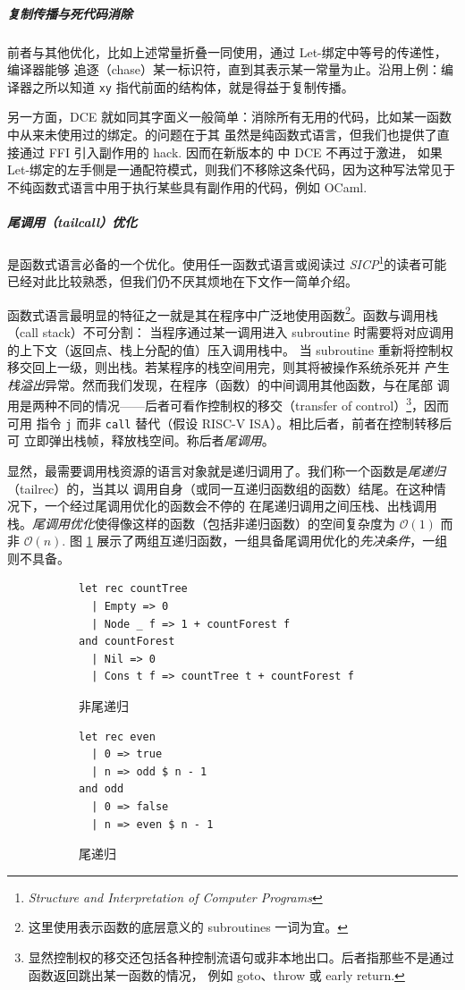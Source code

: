 \subparagraph{复制传播与死代码消除} 前者与其他优化，比如上述常量折叠一同使用，通过 Let-绑定中等号的传递性，编译器能够
追逐（chase）某一标识符，直到其表示某一常量为止。沿用上例：编译器之所以知道 \texttt{xy} 指代前面的结构体，就是得益于复制传播。

另一方面，DCE 就如同其字面义一般简单：消除所有无用的代码，比如某一函数中从来未使用过的绑定。\Tigris 的问题在于其
虽然是纯函数式语言，但我们也提供了直接通过 FFI 引入副作用的 hack. 因而在新版本的 \Tigris 中 DCE 不再过于激进，
如果 Let-绑定的左手侧是一通配符模式，则我们不移除这条代码，因为这种写法常见于不纯函数式语言中用于执行某些具有副作用的代码，例如 OCaml.

\subparagraph{尾调用（tailcall）优化} 是函数式语言必备的一个优化。使用任一函数式语言或阅读过 \emph{SICP}\footnote{
  \emph{Structure and Interpretation of Computer Programs}
}的读者可能已经对此比较熟悉，但我们仍不厌其烦地在下文作一简单介绍。

函数式语言最明显的特征之一就是其在程序中广泛地使用函数\footnote{这里使用表示函数的底层意义的 subroutines 一词为宜。}。函数与调用栈（call stack）不可分割：
当程序通过某一调用进入 subroutine 时需要将对应调用的上下文（返回点、栈上分配的值）压入调用栈中。
当 subroutine 重新将控制权移交回上一级，则出栈。若某程序的栈空间用完，则其将被操作系统杀死并
产生\emph{栈溢出}异常。然而我们发现，在程序（函数）的中间调用其他函数，与在尾部
调用是两种不同的情况——后者可看作控制权的移交（transfer of control）\footnote{
  显然控制权的移交还包括各种控制流语句或非本地出口。后者指那些不是通过函数返回跳出某一函数的情况，
  例如 goto、throw 或 early return.
}，因而可用
指令 \texttt{j} 而非 \texttt{call} 替代（假设 RISC-V ISA）。相比后者，前者在控制转移后可
立即弹出栈帧，释放栈空间。称后者\emph{尾调用}。

显然，最需要调用栈资源的语言对象就是递归调用了。我们称一个函数是\emph{尾递归}（tailrec）的，当其以
调用自身（或同一互递归函数组的函数）结尾。在这种情况下，一个经过尾调用优化的函数会不停的
在尾递归调用之间压栈、出栈调用栈。\emph{尾调用优化}使得像这样的函数（包括非递归函数）的空间复杂度为 $\mathcal{O}(1)$
而非 $\mathcal{O}(n)$. 图 \ref{code:tail-comparison} 展示了两组互递归函数，一组具备尾调用优化的\emph{先决条件}，一组则不具备。
\begin{figure}
  \centering
  \begin{subfigure}{0.65\textwidth}\centering
    \begin{verbatim}
let rec countTree
  | Empty => 0
  | Node _ f => 1 + countForest f
and countForest
  | Nil => 0
  | Cons t f => countTree t + countForest f
    \end{verbatim}
    \caption{非尾递归}
  \end{subfigure}%
  \begin{subfigure}{0.35\textwidth}\centering
    \begin{verbatim}
let rec even
  | 0 => true
  | n => odd $ n - 1
and odd
  | 0 => false
  | n => even $ n - 1
    \end{verbatim}
    \caption{尾递归}
  \end{subfigure}
  \caption{}\label{code:tail-comparison}
\end{figure}

